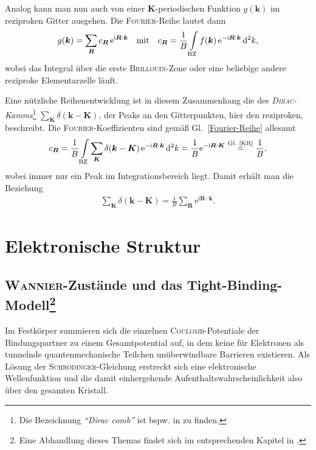 \documentclass[a4paper, 10pt, twoside, openany]{book} %
\def \I {\mathrm i}
\def \E {\mathrm e}
\def \D {\mathrm d}
\def \vec {\boldsymbol}
\begin{document}
	Analog kann man nun auch von einer $\vec K$-periodischen Funktion $g(\vec k)$ im reziproken Gitter ausgehen. Die \textsc{Fourier}-Reihe lautet dann
	\begin{align}
		g(\vec k) = \sum_{\vec R} c_{\vec R} \, \E^{\I \vec R \cdot \vec k} \quad \text{mit} \quad c_{\vec R} = \frac 1 B \int \limits_{\rm BZ} f(\vec k) \, \E^{-\I \vec R \cdot \vec k} \, \D^2 k,
		\label{Fourier-Reihe}
	\end{align}
	wobei das Integral über die erste \textsc{Brillouin}-Zone oder eine beliebige andere reziproke Elementarzelle läuft.
	
	Eine nützliche Reihenentwicklung ist in diesem Zusammenhang die des \emph{\textsc{Dirac}-Kamms}\footnote{Die Bezeichnung \emph{"`Dirac comb"'} ist bspw. in \cite[S.~191]{Cordoba} zu finden.} $\sum_{\vec K} \delta(\vec k - \vec K)$, der Peaks an den Gitterpunkten, hier den reziproken, beschreibt. Die \textsc{Fourier}-Koeffizienten sind gemäß Gl.~\ref{Fourier-Reihe} allesamt
	\begin{align*}
		c_{\vec R} = \frac 1 B \int \limits_{\rm BZ} \sum_{\vec K} \delta(\vec k - \vec K) \, \E^{-\I \vec R \cdot \vec k} \, \D^2 k = \frac 1 B \E^{-\I \vec R \cdot \vec K} \overset{\text{Gl.~\ref{KR}}} = \frac 1 B,
	\end{align*}
	wobei immer nur ein Peak im Integrationsbereich liegt. Damit erhält man die Beziehung
	\begin{align}
		\sum_{\vec K} \delta(\vec k - \vec K) = \frac 1 B \sum_{\vec R} \E^{\I \vec R \cdot \vec k}.
		\label{Dirac-Kamm}
	\end{align}
	
	\section{Elektronische Struktur}
	
	\subsection[\textsc{Wannier}-Zustände und das Tight-Binding-Modell]{\textsc{Wannier}-Zustände und das Tight-Binding-Modell\footnote{Eine Abhandlung dieses Themas findet sich im entsprechenden Kapitel in \cite[S.~109ff]{Czycholl}.}}
	\label{Wannier-Zustaende}
	
	Im Festkörper summieren sich die einzelnen \textsc{Coulomb}-Potentiale der Bindungspartner zu einem Gesamtpotential auf, in dem keine für Elektronen als tunnelnde quantenmechanische Teilchen unüberwindbare Barrieren existieren. Als Lösung der \textsc{Schrödinger}-Gleichung erstreckt sich eine elektronische Wellenfunktion und die damit einhergehende Aufenthaltswahrscheinlichkeit also über den gesamten Kristall.
	
\end{document}
